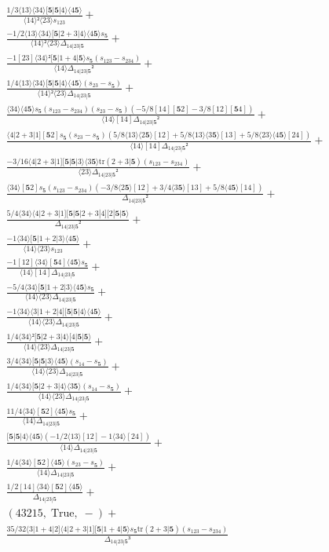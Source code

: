 \documentclass[varwidth, border=5pt]{standalone}
\newcommand{\tr}{\text{tr}}
\begin{document}
\begin{my}
$\begin{gathered}
\scriptscriptstyle\frac{1/3⟨13⟩⟨34⟩[𝟓|𝟓|4⟩⟨4𝟓⟩}{⟨14⟩²⟨23⟩s_{123}} +\\
\scriptscriptstyle\frac{-1/2⟨13⟩⟨34⟩[𝟓|2+3|4⟩⟨4𝟓⟩s_{𝟓}}{⟨14⟩²⟨23⟩Δ_{14|23|𝟓}} +\\
\scriptscriptstyle\frac{-1[23]⟨34⟩²[𝟓|1+4|𝟓⟩s_{𝟓}(s_{123}-s_{234})}{⟨14⟩Δ_{14|23|𝟓}²} +\\
\scriptscriptstyle\frac{1/4⟨13⟩⟨34⟩[𝟓|𝟓|4⟩⟨4𝟓⟩(s_{23}-s_{𝟓})}{⟨14⟩²⟨23⟩Δ_{14|23|𝟓}} +\\
\scriptscriptstyle\frac{⟨34⟩⟨4𝟓⟩s_{𝟓}(s_{123}-s_{234})(s_{23}-s_{𝟓})(-5/8[14][𝟓2]-3/8[12][𝟓4])}{⟨14⟩[14]Δ_{14|23|𝟓}²} +\\
\scriptscriptstyle\frac{⟨4|2+3|1][𝟓2]s_{𝟓}(s_{23}-s_{𝟓})(5/8⟨13⟩⟨2𝟓⟩[12]+5/8⟨13⟩⟨3𝟓⟩[13]+5/8⟨23⟩⟨4𝟓⟩[24])}{⟨14⟩[14]Δ_{14|23|𝟓}²} +\\
\scriptscriptstyle\frac{-3/16⟨4|2+3|1][𝟓|𝟓|3⟩⟨3𝟓⟩\tr(2+3|𝟓)(s_{123}-s_{234})}{⟨23⟩Δ_{14|23|𝟓}²} +\\
\scriptscriptstyle\frac{⟨34⟩[𝟓2]s_{𝟓}(s_{123}-s_{234})(-3/8⟨2𝟓⟩[12]+3/4⟨3𝟓⟩[13]+5/8⟨4𝟓⟩[14])}{Δ_{14|23|𝟓}²} +\\
\scriptscriptstyle\frac{5/4⟨34⟩⟨4|2+3|1][𝟓|𝟓|2+3|4][2|𝟓|𝟓⟩}{Δ_{14|23|𝟓}²} +\\
\scriptscriptstyle\frac{-1⟨34⟩[𝟓|1+2|3⟩⟨4𝟓⟩}{⟨14⟩⟨23⟩s_{123}} +\\
\scriptscriptstyle\frac{-1[12]⟨34⟩[𝟓4]⟨4𝟓⟩s_{𝟓}}{⟨14⟩[14]Δ_{14|23|𝟓}} +\\
\scriptscriptstyle\frac{-5/4⟨34⟩[𝟓|1+2|3⟩⟨4𝟓⟩s_{𝟓}}{⟨14⟩⟨23⟩Δ_{14|23|𝟓}} +\\
\scriptscriptstyle\frac{-1⟨34⟩⟨3|1+2|4][𝟓|𝟓|4⟩⟨4𝟓⟩}{⟨14⟩⟨23⟩Δ_{14|23|𝟓}} +\\
\scriptscriptstyle\frac{1/4⟨34⟩²[𝟓|2+3|4⟩[4|𝟓|𝟓⟩}{⟨14⟩⟨23⟩Δ_{14|23|𝟓}} +\\
\scriptscriptstyle\frac{3/4⟨34⟩[𝟓|𝟓|3⟩⟨4𝟓⟩(s_{14}-s_{𝟓})}{⟨14⟩⟨23⟩Δ_{14|23|𝟓}} +\\
\scriptscriptstyle\frac{1/4⟨34⟩[𝟓|2+3|4⟩⟨3𝟓⟩(s_{14}-s_{𝟓})}{⟨14⟩⟨23⟩Δ_{14|23|𝟓}} +\\
\scriptscriptstyle\frac{11/4⟨34⟩[𝟓2]⟨4𝟓⟩s_{𝟓}}{⟨14⟩Δ_{14|23|𝟓}} +\\
\scriptscriptstyle\frac{[𝟓|𝟓|4⟩⟨4𝟓⟩(-1/2⟨13⟩[12]-1⟨34⟩[24])}{⟨14⟩Δ_{14|23|𝟓}} +\\
\scriptscriptstyle\frac{1/4⟨34⟩[𝟓2]⟨4𝟓⟩(s_{23}-s_{𝟓})}{⟨14⟩Δ_{14|23|𝟓}} +\\
\scriptscriptstyle\frac{1/2[14]⟨34⟩[𝟓2]⟨4𝟓⟩}{Δ_{14|23|𝟓}} +\\
\scriptscriptstyle(43215,\;\text{True},\;-) +\\
\scriptscriptstyle\frac{35/32⟨3|1+4|2]⟨4|2+3|1][𝟓|1+4|𝟓⟩s_{𝟓}\tr(2+3|𝟓)(s_{123}-s_{234})}{Δ_{14|23|𝟓}³} \phantom{+}
\end{gathered}$
\end{my}
\end{document}
